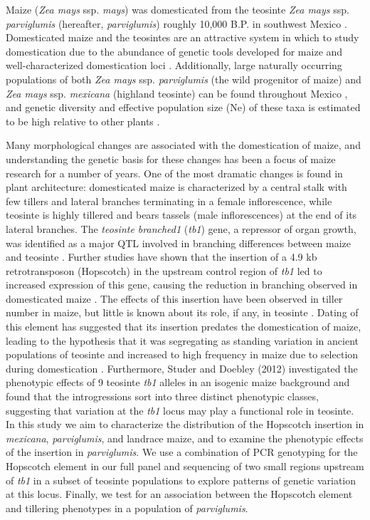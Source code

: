 \documentclass[12pt]{article}
\begin{document}
Maize (\emph{Zea mays} ssp. \emph{mays}) was domesticated from the teosinte \emph{Zea mays} ssp. \emph{parviglumis} (hereafter, \emph{parviglumis}) roughly 10,000 B.P. in southwest Mexico \cite{Piperno et al 2009, Matsuoka et al 2002}. Domesticated maize and the teosintes are an attractive system in which to study domestication due to the abundance of genetic tools developed for maize and well-characterized domestication loci \cite{Hufford et al 2012a, Doebley 2004, Hufford et al 2012b}. Additionally, large naturally occurring populations of both \emph{Zea mays} ssp. \emph{parviglumis} (the wild progenitor of maize) and \emph{Zea mays} ssp. \emph{mexicana} (highland teosinte) can be found throughout Mexico \cite{Wilkes 1977, Hufford et al 2013}, and genetic diversity and effective population size (Ne) of these taxa is estimated to be high \cite{Ross-Ibarra et al 2009} relative to other plants \cite{Nybom 2004}.

Many morphological changes are associated with the domestication of maize, and understanding the genetic basis for these changes has been a focus of maize research for a number of years. One of the most dramatic changes is found in plant architecture: domesticated maize is characterized by a central stalk with few tillers and lateral branches terminating in a female inflorescence, while teosinte is highly tillered and bears tassels (male inflorescences) at the end of its lateral branches. The \emph{teosinte branched1} (\emph{tb1}) gene, a repressor of organ growth, was identified as a major QTL involved in branching differences between maize and teosinte \cite{Doebley et al 1990, Doebley and Stec 1991, Lukens and Doebley 1999}. Further studies have shown that the insertion of a 4.9 kb retrotransposon (Hopscotch) in the upstream control region of \emph{tb1} led to increased expression of this gene, causing the reduction in branching observed in domesticated maize \cite{Studer et al 2011}. The effects of this insertion have been observed in tiller number in maize, but little is known about its role, if any, in teosinte \cite{Studer et al 2011}. Dating of this element has suggested that its insertion predates the domestication of maize, leading to the hypothesis that it was segregating as standing variation in ancient populations of teosinte and increased to high frequency in maize due to selection during domestication \cite{Studer et al 2011}. Furthermore, Studer and Doebley (2012) \cite{Studer and Doebley 2012} investigated the phenotypic effects of 9 teosinte \emph{tb1} alleles in an isogenic maize background and found that the introgressions sort into three distinct phenotypic classes, suggesting that variation at the \emph{tb1} locus may play a functional role in teosinte. In this study we aim to characterize the distribution of the Hopscotch insertion in \emph{mexicana}, \emph{parviglumis}, and landrace maize, and to examine the phenotypic effects of the insertion in \emph{parviglumis}. We use a combination of PCR genotyping for the Hopscotch element in our full panel and sequencing of two small regions upstream of \emph{tb1} in a subset of teosinte populations to explore patterns of genetic variation at this locus. Finally, we test for an association between the Hopscotch element and tillering phenotypes in a population of \emph{parviglumis}.
\end{document}

